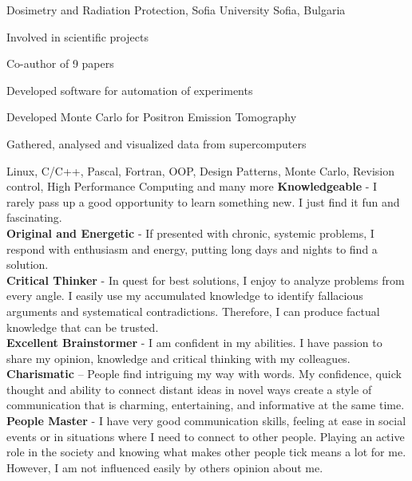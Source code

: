 {Dosimetry and Radiation Protection, Sofia University} {Sofia, Bulgaria}
{
 \item Involved in scientific projects 
 \item Co-author of 9 papers
 \item Developed software for automation of experiments
}
{ 
 \item Developed Monte Carlo for Positron Emission Tomography
 \item Gathered, analysed and visualized data from supercomputers
}
{Linux, C/C++, Pascal, Fortran, OOP, Design Patterns, Monte Carlo, Revision control, High Performance Computing and many more}
\vspace{-0.8cm}
\small
\textbf{Knowledgeable} - I rarely pass up a good opportunity to learn something
new. I just find it fun and fascinating.\\
\textbf{Original and Energetic} - If presented with chronic, systemic
problems, I respond with enthusiasm and energy, putting long days and nights to find a solution.\\
\textbf{Critical Thinker} - In quest for best solutions, I enjoy to analyze problems from every angle. I easily use my accumulated knowledge to identify fallacious arguments and systematical contradictions. Therefore, I can produce factual knowledge that can be trusted.\\
\textbf{Excellent Brainstormer} - I am confident in my abilities. I
have passion to share my opinion, knowledge and critical thinking with my colleagues.\\
\textbf{Charismatic} – People find intriguing my way with words. My confidence, quick thought and ability to connect distant ideas in novel ways create a style of communication that is charming, entertaining, and informative at the same time.\\
\textbf{People Master} - I have very good communication skills, feeling at ease in social events or in situations where I need to connect to other people. Playing an active role in the society and knowing what makes other people tick means a lot for me. However, I am not influenced easily by others opinion about me.


